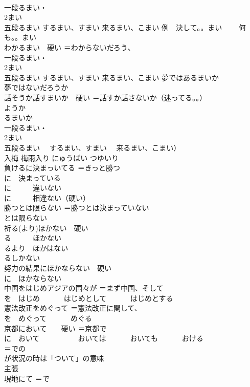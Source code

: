 \documentclass[8pt]{extreport}
\begin{document}
\begin{CJK}{UTF8}{min}
\\	一段るまい・
\\	2まい 
\\	五段るまい するまい、すまい 来るまい、こまい 例　決して。。まい 　　何も。。まい
\\	わかるまい　硬い	＝わからないだろう、
\\	一段るまい・
\\	2まい 
\\	五段るまい するまい、すまい 来るまい、こまい 夢ではあるまいか 
\\	夢ではないだろうか
\\	話そうか話すまいか　硬い	＝話すか話さないか（迷ってる。。） 
\\	ようか
\\	るまいか 　
\\	一段るまい・
\\	2まい 　
\\	五段るまい 　するまい、すまい 　来るまい、こまい）
\\	入梅 梅雨入り	にゅうばい つゆいり 
\\	負けるに決まっいてる	＝きっと勝つ 
\\	に　決まっている 
\\	に　　　違いない　　　 
\\	に　　　相違ない（硬い）
\\	勝つとは限らない	＝勝つとは決まっていない 
\\	とは限らない
\\	祈る(より)ほかない　硬い	
\\	る　　　ほかない 
\\	るより　ほかはない 
\\	るしかない
\\	努力の結果にほかならない　硬い	
\\	に　ほかならない
\\	中国をはじめアジアの国々が	＝まず中国、そして 
\\	を　はじめ 　　　はじめとして 　　　はじめとする
\\	憲法改正をめぐって	＝憲法改正に関して、
\\	を　めぐって 　　　めぐる
\\	京都において　　硬い	＝京都で 
\\	に　おいて　　 　　　おいては 　　　おいても 　　　おける
\\	＝での
\\	が状況の時は「ついて」の意味
\\	主張	
\\	現地にて	＝で 

\end{CJK}
\end{document}
